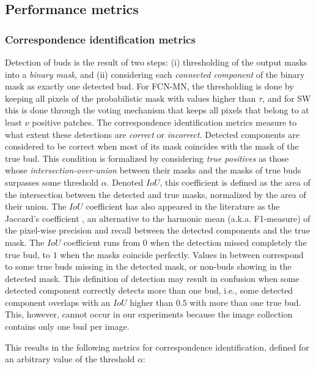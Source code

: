 \documentclass[a4paper,authoryear,review]{elsarticle}
\begin{document}
	\subsection{Performance metrics}
	\label{sec:metrics}
	
	\subsubsection{Correspondence identification metrics}
	\label{subsec:detectmetrics}
	
	Detection of buds is the result of two steps: (i) thresholding of the output masks into a \emph{binary mask}, and (ii) considering each \emph{connected component} of the binary mask as exactly one detected bud. For FCN-MN, the thresholding is done by keeping all pixels of the probabilistic mask with values higher than $\tau$, and for SW this is done through the voting mechanism that keeps all pixels that belong to at least $\nu$ positive patches.
	The correspondence identification metrics measure to what extent these detections are \emph{correct} or \emph{incorrect}. Detected components are considered to be correct when most of its mask coincides with the mask of the true bud. This condition is formalized by considering \emph{true positives} as those whose \emph{intersection-over-union} between their masks and the masks of true buds surpasses some threshold $\alpha$. Denoted $IoU$, this coefficient is defined as the area of the intersection between the detected and true masks, normalized by the area of their union. The $IoU$ coefficient  has also appeared in the literature as the Jaccard’s coefficient \citep{jaccard1912distribution}, an alternative to the harmonic mean (a.k.a. F1-measure) of the pixel-wise precision and recall between the detected components and the true mask. The $IoU$ coefficient runs from $0$ when the detection missed completely the true bud, to $1$ when the masks coincide perfectly. Values in between correspond to some true buds missing in the detected mask, or non-buds showing in the detected mask. 
	This definition of detection may result in confusion when some detected component correctly detects more than one bud, i.e., some detected component overlaps with an $IoU$ higher than $0.5$ with more than one true bud. This, however, cannot occur in our experiments because the image collection contains only one bud per image. 
	
	This results in the following metrics for correspondence identification, defined for an arbitrary value of the threshold $\alpha$:
	
\end{document}
